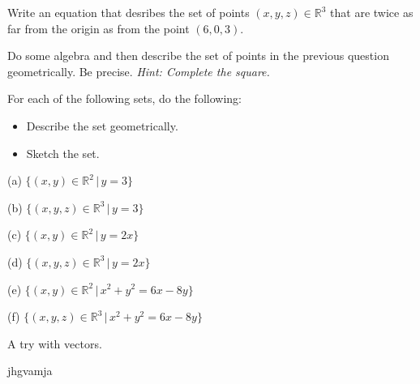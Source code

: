\documentclass{ximera}
\begin{document}
\begin{question}  \label{Q50:Coordinates}
Write an equation that desribes the set of points $(x,y,z)\in \mathbb{R}^3$ that are twice as far from the origin as from the point $(6,0,3)$.
\begin{selectAll}
\end{selectAll}
\end{question}

\begin{question}  \label{Q51:Coordinates}
Do some algebra and then describe the set of points in the previous question geometrically. Be precise. \it{Hint:} Complete the square.
\end{question}





\begin{question} \label{Q1:Coordinates}
For each of the following sets, do the following:

\begin{itemize}
\item{Describe the set geometrically.}

\item{Sketch the set.}

\end{itemize}

(a) $\{  (x,y)\in \mathbb{R}^2 \, | \, y=3  \}$

(b) $\{  (x,y,z)\in \mathbb{R}^3 \, | \, y=3  \}$

(c) $\{  (x,y)\in \mathbb{R}^2 \, | \, y=2x  \}$

(d) $\{  (x,y,z)\in \mathbb{R}^3 \, | \, y=2x  \}$

(e) $\{  (x,y)\in \mathbb{R}^2 \, | \,  x^2 + y^2 = 6x - 8y  \}$

(f)  $\{  (x,y,z)\in \mathbb{R}^3 \, | \, x^2 + y^2 = 6x - 8y  \}$

\end{question}






A try with vectors.

 
\begin{onlineOnly}
    \begin{center}
\end{center}
\end{onlineOnly}

jhgvamja
\end{document}
